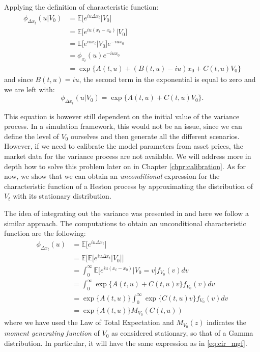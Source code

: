 Applying the definition of characteristic function:
\begin{equation*}
	\begin{split}
	\phi_{\Delta x_t}(u|V_0) &= \mathbb{E}\big[e^{i u \Delta x_t} |V_0\big] \\
	&=  \mathbb{E}\big[e^{i u ( x_t - x_0)}|V_0\big]\\
	&= \mathbb{E}\big[e^{i u x_t}|V_0\big] e^{-i u x_0}\\
	&= \phi_{x_t}(u) e^{-i u x_0}\\
	&= \exp\{A(t,u) + (B(t,u) - iu) x_0 + C(t,u) V_0\}
	\end{split}
\end{equation*}
\noindent
and since $B(t,u)  = i u$, the second term in the exponential is equal to zero and we are left with:
\begin{equation}
\label{eq:chf_V0}
\phi_{\Delta x_t}(u|V_0) =  \exp\{A(t,u) + C(t,u) V_0\}.
\end{equation}




This equation is however still dependent on the initial value of the variance process. In a simulation framework, this would not be an issue, since we can define the level of $V_0$ ourselves and then generate all the different scenarios. However, if we need to calibrate the model parameters from asset prices, the market data for the variance process are not available. We will address more in depth how to solve this problem later on in Chapter \ref{chpr:calibration}. As for now, we show that we can obtain an \textit{unconditional} expression for the characteristic function of a Heston process by approximating the distribution of $V_t$ with its stationary distribution.

The idea of integrating out the variance was presented in \citep{DRAGULESCU2002} and here we follow a similar approach.
The computations to obtain an unconditional characteristic function are the following:
\begin{equation*}
\begin{split}
	\phi_{\Delta x_t}(u) &= \mathbb{E}\big[e^{i u \Delta x_t} \big] \\
	&= \mathbb{E}\big[ \mathbb{E}\big[ e^{i u \Delta x_t} | V_0\big] \big]\\
	&=  \int_{0}^{\infty} \mathbb{E}\big[e^{i u ( x_t - x_0)}|V_0 = v \big] f_{V_0}(v) dv \\
	&= \int_{0}^{\infty} \exp\{A(t,u) + C(t,u) v\} f_{V_0}(v) dv \\
	&=  \exp\{A(t,u)\} \int_{0}^{\infty}  \exp \{C(t,u) v\} f_{V_0}(v) dv\\
	&= \exp\{A(t,u) \} M_{V_0}(C(t,u))
\end{split}
\end{equation*}
\noindent
where we have used the Law of Total Expectation and $M_{V_0}(z)$ indicates the \textit{moment generating function} of $V_0$ as considered stationary, so that of a Gamma distribution. In particular, it will have the same expression as in \eqref{eq:cir_mgf}.



